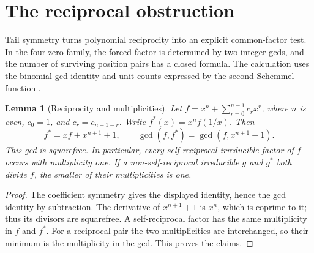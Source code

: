\documentclass[11pt]{article}
\newtheorem{lemma}[proposition]{Lemma}
\theoremstyle{definition}
\theoremstyle{remark}
\begin{document}
\section{The reciprocal obstruction}
\label{sec:reciprocal-screen}

Tail symmetry turns polynomial reciprocity into an explicit common-factor
test. In the four-zero family, the forced factor is determined by two
integer gcds, and the number of surviving position pairs has a closed
formula. The calculation uses the binomial gcd identity \cite{LN} and
unit counts expressed by the second Schemmel function \cite[Section~1]{Def20}.

\begin{lemma}[Reciprocity and multiplicities]
\label{lem:reciprocal-multiplicity}
Let \(f=x^n+\sum_{r=0}^{n-1}c_rx^r\), where \(n\) is even,
\(c_0=1\), and \(c_r=c_{n-1-r}\). Write
\(f^*(x)=x^nf(1/x)\). Then
\[
 f^*=xf+x^{n+1}+1,\qquad
 \gcd(f,f^*)=\gcd(f,x^{n+1}+1).
\]
This gcd is squarefree. In particular, every self-reciprocal
irreducible factor of \(f\) occurs with multiplicity one. If a
non-self-reciprocal irreducible \(g\) and \(g^*\) both divide \(f\),
the smaller of their multiplicities is one.
\end{lemma}
\begin{proof}
The coefficient symmetry gives the displayed identity, hence the gcd
identity by subtraction. The derivative of \(x^{n+1}+1\) is \(x^n\),
which is coprime to it; thus its divisors are squarefree. A
self-reciprocal factor has the same multiplicity in \(f\) and \(f^*\).
For a reciprocal pair the two multiplicities are interchanged, so
their minimum is the multiplicity in the gcd. This proves the claims.
\end{proof}
\end{document}
